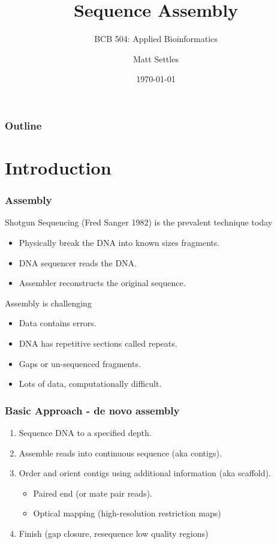 \documentclass[pdf]{beamer}
\begin{document}
\title[Sequence Assembly]{Sequence Assembly}
\subtitle{BCB 504: Applied Bioinformatics\\}
\author[Matt Settles]{Matt Settles}
\date{\today}


\begin{frame}[plain]
  \titlepage
\end{frame}


\begin{frame}[plain] 
  \frametitle{Outline}
  \tableofcontents
\end{frame}

\section{Introduction}
\begin{frame}
  \frametitle{Assembly}
Shotgun Sequencing (Fred Sanger 1982) is the prevalent technique today
\begin{itemize}
\item Physically break the DNA into known sizes fragments.
\item DNA sequencer reads the DNA.
\item Assembler reconstructs the original sequence.
\end{itemize}
Assembly is challenging
\begin{itemize}
\item Data contains errors.
\item DNA has repetitive sections called repeats.
\item Gaps or un-sequenced fragments.
\item Lots of data, computationally difficult.
\end{itemize}
\end{frame}

\begin{frame}
\frametitle{Basic Approach - de novo assembly}
\begin{enumerate}
\item Sequence DNA to a specified depth.
\item Assemble reads into continuous sequence (aka contigs).
\item Order and orient contigs using additional information (aka scaffold).
\begin{itemize}
\item Paired end (or mate pair reads).
\item Optical mapping (high-resolution restriction maps)
\end{itemize}
\item Finish (gap closure, resequence low quality regions)
\end{enumerate}
\end{frame}
\end{document}
